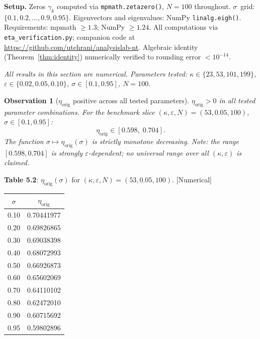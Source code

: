 \documentclass[11pt]{article}
\newtheorem{observation}[theorem]{Observation}
\newcommand{\etaorig}{\eta_{\mathrm{orig}}}
\begin{document}
\textbf{Setup.}
Zeros $\gamma_k$ computed via \texttt{mpmath.zetazero()}, $N=100$ throughout.
$\sigma$~grid: $\{0.1,0.2,\ldots,0.9,0.95\}$.
Eigenvectors and eigenvalues: NumPy \texttt{linalg.eigh()}.
Requirements: mpmath $\geq 1.3$; NumPy $\geq 1.24$.
All computations via \texttt{eta\_verification.py}; companion code at
\url{https://github.com/utehrani/analysislab-nt}.
Algebraic identity (Theorem~\ref{thm:identity}) numerically verified to
rounding error $<10^{-14}$.

\emph{All results in this section are numerical. Parameters tested:
$\kappa\in\{23,53,101,199\}$, $\varepsilon\in\{0.02,0.05,0.10\}$,
$\sigma\in[0.1,0.95]$, $N=100$.}

\begin{observation}[$\etaorig$ positive across all tested parameters]
$\etaorig>0$ in all tested parameter combinations. For the benchmark slice
$(\kappa,\varepsilon,N)=(53,0.05,100)$, $\sigma\in[0.1,0.95]$:
\[
\etaorig\in[0.598,\;0.704].
\]
The function $\sigma\mapsto\etaorig(\sigma)$ is strictly monotone decreasing.
Note: the range $[0.598,0.704]$ is strongly $\varepsilon$-dependent; no
universal range over all $(\kappa,\varepsilon)$ is claimed.
\end{observation}

\textbf{Table 5.2}: $\etaorig(\sigma)$ for $(\kappa,\varepsilon,N)=(53,0.05,100)$.
[Numerical]

\begin{center}
\begin{tabular}{cc}
\toprule
$\sigma$ & $\etaorig$ \\
\midrule
0.10 & 0.70441977 \\
0.20 & 0.69826865 \\
0.30 & 0.69038398 \\
0.40 & 0.68072993 \\
0.50 & 0.66926873 \\
0.60 & 0.65602069 \\
0.70 & 0.64110102 \\
0.80 & 0.62472010 \\
0.90 & 0.60715692 \\
0.95 & 0.59802896 \\
\bottomrule
\end{tabular}
\end{center}
\end{document}
